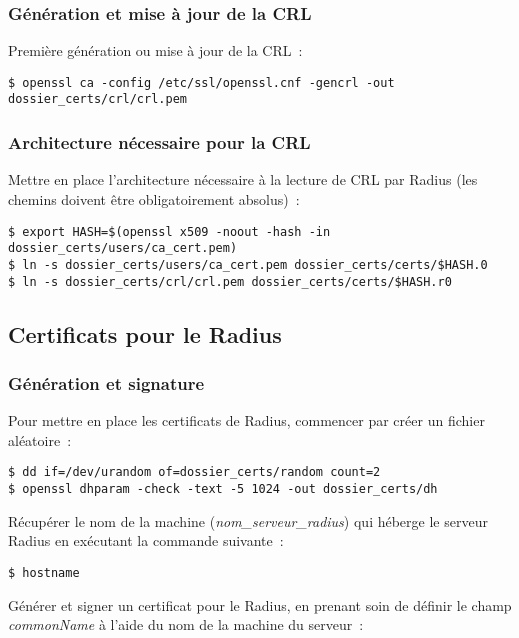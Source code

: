 \subsubsection{Génération et mise à jour de la CRL}
\label{gen-crl}

Première génération ou mise à jour de la CRL~:

\begin{lstlisting}
$ openssl ca -config /etc/ssl/openssl.cnf -gencrl -out dossier_certs/crl/crl.pem
\end{lstlisting}

\subsubsection{Architecture nécessaire pour la CRL}

Mettre en place l'architecture nécessaire à la lecture de CRL par Radius (les chemins doivent être obligatoirement absolus)~:

\begin{lstlisting}
$ export HASH=$(openssl x509 -noout -hash -in dossier_certs/users/ca_cert.pem)
$ ln -s dossier_certs/users/ca_cert.pem dossier_certs/certs/$HASH.0
$ ln -s dossier_certs/crl/crl.pem dossier_certs/certs/$HASH.r0
\end{lstlisting}

\subsection{Certificats pour le Radius}
\subsubsection{Génération et signature}

Pour mettre en place les certificats de Radius, commencer par créer un fichier aléatoire~: 

\begin{lstlisting}
$ dd if=/dev/urandom of=dossier_certs/random count=2
$ openssl dhparam -check -text -5 1024 -out dossier_certs/dh
\end{lstlisting}

Récupérer le nom de la machine (\emph{nom\_serveur\_radius}) qui héberge le serveur Radius en exécutant la commande suivante~:

\begin{lstlisting}
$ hostname
\end{lstlisting}

Générer et signer un certificat pour le Radius, en prenant soin de définir le champ \emph{commonName} à l'aide du nom de la machine du serveur~:

